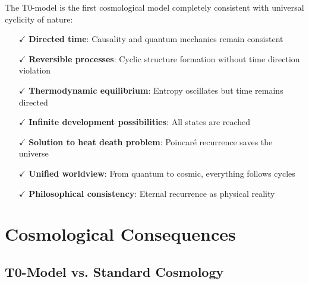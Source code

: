 \documentclass[12pt,a4paper]{article}
\theoremstyle{definition}
\begin{document}
	\begin{revolutionary}
		The T0-model is the first cosmological model completely consistent with universal cyclicity of nature:
		\begin{itemize}
			\item[$\checkmark$] \textbf{Directed time}: Causality and quantum mechanics remain consistent
			\item[$\checkmark$] \textbf{Reversible processes}: Cyclic structure formation without time direction violation  
			\item[$\checkmark$] \textbf{Thermodynamic equilibrium}: Entropy oscillates but time remains directed
			\item[$\checkmark$] \textbf{Infinite development possibilities}: All states are reached
			\item[$\checkmark$] \textbf{Solution to heat death problem}: Poincaré recurrence saves the universe
			\item[$\checkmark$] \textbf{Unified worldview}: From quantum to cosmic, everything follows cycles
			\item[$\checkmark$] \textbf{Philosophical consistency}: Eternal recurrence as physical reality
		\end{itemize}
	\end{revolutionary}
	
	\section{Cosmological Consequences}
	
	\subsection{T0-Model vs. Standard Cosmology}
	
\end{document}
